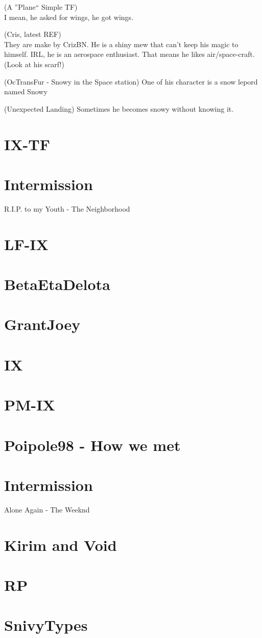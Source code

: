 \documentclass{article}
\begin{document}
\noindent
(A ''Plane`` Simple TF) \\
I mean, he asked for wings, he got wings.

\noindnet
(Cris, latest REF) \\
They are make by CrizBN. He is a shiny mew that can't keep his magic to himself. IRL, he
is an aerospace enthusiast. That means he likes air/space-craft. (Look at his scarf!)

(OcTransFur - Snowy in the Space station) One of his character is a snow lepord named Snowy

(Unexpected Landing) Sometimes he becomes snowy without knowing it.

\section{IX-TF}

\section{Intermission}
R.I.P. to my Youth - The Neighborhood

\section{LF-IX}

\section{BetaEtaDelota}

\section{GrantJoey}

\section{IX}

\section{PM-IX}

\section{Poipole98 - How we met}

\section{Intermission}
Alone Again - The Weeknd

\section{Kirim and Void}

\section{RP}

\section{SnivyTypes}
\end{document}
